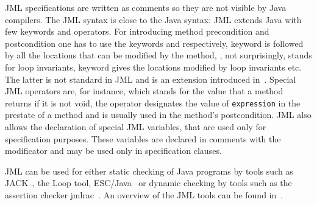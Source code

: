 JML specifications are written as comments so they are not visible by Java compilers. The JML syntax is close to the 
 Java syntax: JML extends Java with few keywords and operators.
 For introducing method precondition and postcondition one has to use the keywords  and  
  respectively,   keyword is followed by all the locations that can be modified by the method, 
  , not surprisingly, stands for loop invariants,  keyword gives the locations modified by loop invariants etc. 
  The latter is not standard in JML and is an extension introduced in~\cite{BRL-JACK}. Special JML operators are, for instance,  which stands for the value that a method returns if it is not void, the  operator 
  designates the value of \texttt{expression} in the prestate of a method and is usually used in the method's postcondition. 
  JML also allows the declaration of special JML variables, that are used only for specification purposes. 
These variables are declared in comments with the  modificator and may be used only in specification clauses. 

JML can be used for either static checking of Java programs by tools such as JACK~\cite{BR02jack}, the Loop tool, 
ESC/Java~\cite{escjava} or dynamic checking by tools such as the assertion checker jmlrac~\cite{jmlrac}. An overview of the JML tools can 
be found in~\cite{BurdyCCEKLLP03}.
     
